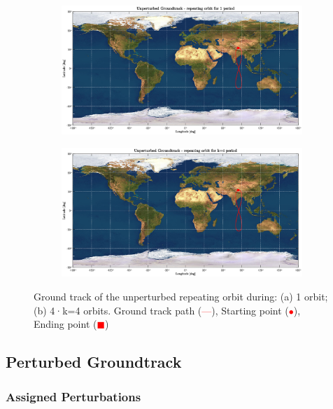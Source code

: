 \documentclass{article}
\newcommand{\reddashedline}{\textcolor{red}{---}}
\begin{document}
\begin{figure}[H]
	\centering
	\begin{subfigure}[b]{0.45\textwidth}
		\includegraphics[width=\textwidth]{ugro1orb.eps}
		\caption{}
		\label{fig:1a}
	\end{subfigure}
	\hfill
	\begin{subfigure}[b]{0.45\textwidth}
		\includegraphics[width=\textwidth]{ugro4orb.eps}
		\caption{}
		\label{fig:1b}
	\end{subfigure}
	
	\caption{Ground track of the unperturbed repeating orbit during: (a) 1 orbit; (b) 4·k=4 orbits. Ground track path (\reddashedline), Starting point (\textcolor{red}{$\bullet$}), Ending point (\textcolor{red}{$\blacksquare$})
	}
\end{figure}

\subsection{Perturbed Groundtrack}
\subsubsection{Assigned Perturbations}
\end{document}
